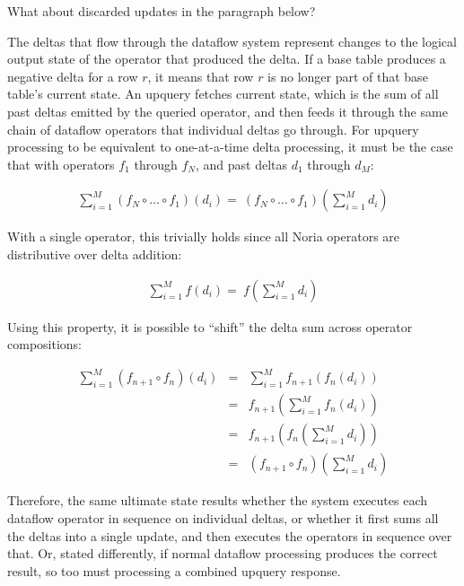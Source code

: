 \begin{inprogress}
  What about discarded updates in the paragraph below?
\end{inprogress}

The deltas that flow through the dataflow system represent changes to the
logical output state of the operator that produced the delta. If a base table
produces a negative delta for a row $r$, it means that row $r$ is no longer part
of that base table's current state. An upquery fetches current state, which is
the sum of all past deltas emitted by the queried operator, and then feeds it
through the same chain of dataflow operators that individual deltas go through.
For upquery processing to be equivalent to one-at-a-time delta processing, it
must be the case that with operators $f_1$ through $f_N$, and past deltas $d_1$
through $d_M$:

\begin{eqnarray*}
  \sum^M_{i=1}\left(f_N \circ \dots \circ f_1\right)\left(d_i\right) = \
  \left(f_N \circ \dots \circ f_1\right)\left(\sum^M_{i=1}d_i\right)
\end{eqnarray*}

With a single operator, this trivially holds since all Noria operators are
distributive over delta addition:

\begin{eqnarray*}
  \sum^M_{i=1}f\left(d_i\right) = \
  f\left(\sum^M_{i=1}d_i\right)
\end{eqnarray*}

Using this property, it is possible to ``shift'' the delta sum across operator
compositions:

\begin{eqnarray*}
  \sum^M_{i=1}\left(f_{n+1} \circ f_n\right)\left(d_i\right) &=& \sum^M_{i=1}f_{n+1}\left(f_n\left(d_i\right)\right) \\
  &=& f_{n+1}\left(\sum^M_{i=1}f_n\left(d_i\right)\right) \\
  &=& f_{n+1}\left(f_n\left(\sum^M_{i=1}d_i\right)\right) \\
  &=& \left(f_{n+1} \circ f_n\right)\left(\sum^M_{i=1}d_i\right)
\end{eqnarray*}

Therefore, the same ultimate state results whether the system executes each
dataflow operator in sequence on individual deltas, or whether it first sums
all the deltas into a single update, and then executes the operators in sequence
over that. Or, stated differently, if normal dataflow processing produces the
correct result, so too must processing a combined upquery response.

